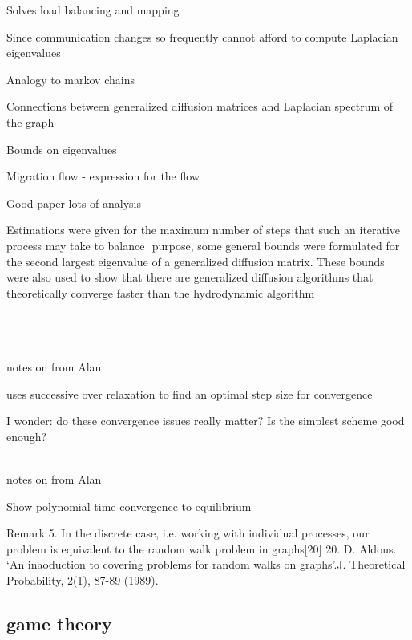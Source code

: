 \documentclass{article}
\begin{document}
Solves load balancing and mapping

Since communication changes so frequently cannot afford to compute Laplacian eigenvalues

Analogy to markov chains

Connections between generalized diffusion matrices and Laplacian spectrum of the graph

Bounds on eigenvalues

Migration flow - expression for the flow

Good paper lots of analysis


Estimations were given for the maximum number of steps that such an iterative process may take to balance
 purpose, some general bounds were formulated for the second largest eigenvalue of a generalized diffusion matrix. These bounds were also used to show that there are generalized diffusion algorithms that theoretically converge faster than the hydrodynamic algorithm 


\cite{ParabolicLB}\\
\cite{CYBENKO1989279}\\
\cite{10.2307/2584287}\\

notes on
\cite{10.2307/2584287}
from Alan

uses successive over relaxation to find an optimal step size for convergence

I wonder: do these convergence issues really matter?  Is the simplest scheme good enough?





\cite{Boillat:1990:LBP:95324.95326}\\

notes on
\cite{Boillat:1990:LBP:95324.95326}
from Alan

Show polynomial time convergence to equilibrium

Remark 5. In the discrete case, i.e. working with individual processes, our problem is equivalent to the random walk problem in graphs[20] 
20. D. Aldous. ‘An inaoduction to covering problems for random walks on graphs’.J. Theoretical 
Probability, 2(1), 87-89 (1989).


\cite{XU199572}





\cite{SCHLOEGEL1997109}






\subsection{game theory}
\end{document}
